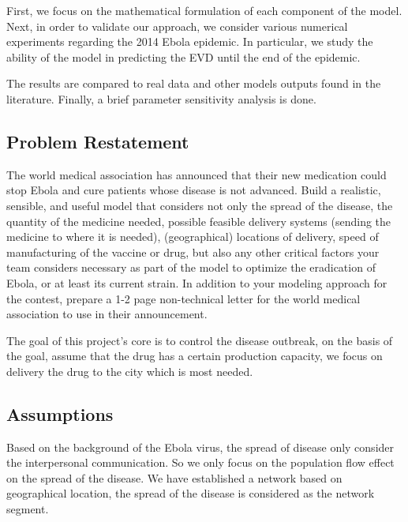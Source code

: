 \documentclass[12pt]{article}
\begin{document}
First, we focus on the mathematical formulation of each component of the model. Next, in order to validate our approach, we consider various numerical experiments regarding the 2014 Ebola epidemic. In particular, we study the ability of the model in predicting the EVD until the end of the epidemic.

The results are compared to real data and other models outputs found in the literature. Finally, a brief parameter sensitivity analysis is done.

\subsection{Problem Restatement}

The world medical association has announced that their new medication could stop Ebola and cure patients whose disease is not advanced. Build a realistic, sensible, and useful model that considers not only the spread of the disease, the quantity of the medicine needed, possible feasible delivery systems (sending the medicine to where it is needed), (geographical) locations of delivery, speed of manufacturing of the vaccine or drug, but also any other critical factors your team considers necessary as part of the model to optimize the eradication of Ebola, or at least its current strain. In addition to your modeling approach for the contest, prepare a 1-2 page non-technical letter for the world medical association to use in their announcement.

The goal of this project's core is to control the disease outbreak, on the basis of the goal, assume that the drug has a certain production capacity, we focus on delivery the drug to the city which is most needed.


\subsection{Assumptions}

Based on the background of the Ebola virus, the spread of disease only consider the interpersonal communication. So we only focus on the population flow effect on the spread of the disease. We have established a network based on geographical location, the spread of the disease is considered as the network segment.
\end{document}
